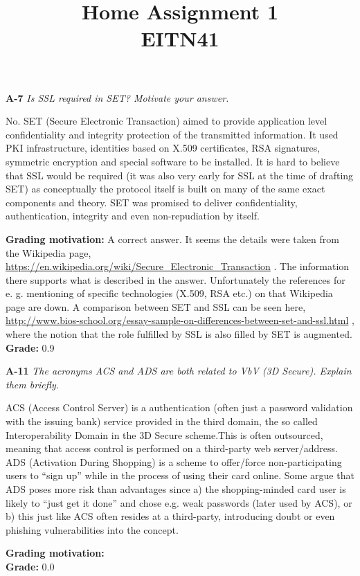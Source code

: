 \documentclass[a4paper]{article}
\title{Home Assignment 1 \\ EITN41}
\author{}
\date{}
\newcommand{\Q}[2]{
  \vspace{10pt} \textbf{#1} \textit{#2}
 }
\newcommand{\A}[1]{ #1 }
\newcommand{\Grade}[2]{ 
  \textbf{Grading motivation:} #2 \\ 
  \hspace*{\fill} \textbf{Grade:} #1 
}
\begin{document}
\maketitle

\Q{A-7} {Is SSL required in SET? Motivate your answer.}

\A{
  No. SET (Secure Electronic Transaction) aimed to provide application level
  confidentiality and integrity protection of the transmitted information. It used PKI infrastructure,
  identities based on X.509 certificates, RSA signatures, symmetric encryption and special
  software to be installed. It is hard to believe that SSL would be required (it was also very early
  for SSL at the time of drafting SET) as conceptually the protocol itself is built on many of the
  same exact components and theory. SET was promised to deliver confidentiality, authentication,
  integrity and even non-repudiation by itself.
}

\Grade{0.9}{
  A correct answer. It seems the details were taken from the Wikipedia page, \url{https://en.wikipedia.org/wiki/Secure_Electronic_Transaction} . 
  The information there supports what is described in the answer.
  Unfortunately the references for e. g. mentioning of specific technologies 
  (X.509, RSA etc.) on that Wikipedia page are down.
  A comparison between SET and SSL can be seen here, \url{http://www.bios-school.org/essay-sample-on-differences-between-set-and-ssl.html} ,
  where the notion that the role fulfilled by SSL is also filled by SET
  is augmented.
}

\Q{A-11} {The acronyms ACS and ADS are both related to VbV (3D Secure). Explain
them briefly.}

\A{
  ACS (Access Control Server) is a authentication (often just a password validation with
  the issuing bank) service provided in the third domain, the so called Interoperability Domain in
  the 3D Secure scheme.This is often outsourced, meaning that access control is performed on a
  third-party web server/address. ADS (Activation During Shopping) is a scheme to offer/force
  non-participating users to “sign up” while in the process of using their card online. Some argue
  that ADS poses more risk than advantages since a) the shopping-minded card user is likely to
  “just get it done” and chose e.g. weak passwords (later used by ACS), or b) this just like ACS
  often resides at a third-party, introducing doubt or even phishing vulnerabilities into the concept.
}

\Grade{0.0}{}
\end{document}
